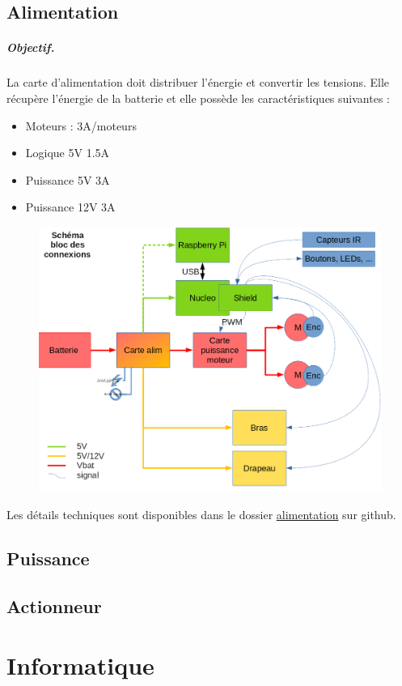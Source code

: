 \documentclass[a4paper,10pt]{report}
\begin{document}
\begin{spacing}{1.5}
\section{Alimentation}
\paragraph{Objectif.} La carte d'alimentation doit distribuer l'énergie et
convertir les tensions. Elle récupère l'énergie de la batterie et elle possède
les caractéristiques suivantes :
\begin{itemize}
\item Moteurs : 3A/moteurs
\item Logique 5V 1.5A
\item Puissance 5V 3A
\item Puissance 12V 3A
\end{itemize}
\begin{figure}[H]
  \center
  \includegraphics[scale=0.4]{schema_bloc_connexions.png}
\end{figure}
Les détails techniques sont disponibles dans le dossier
\href{https://github.com/eirbot/eirbot2020-1A/tree/master/alim}{alimentation}
sur github.
\section{Puissance}
\section{Actionneur}

\chapter{Informatique}

\end{spacing}
\end{document}
